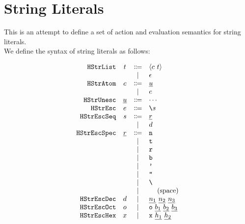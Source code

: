 \documentclass[12pt]{article}
\begin{document}
\section{String Literals}
This is an attempt to define a set of action and evaluation semantics for string literals. \\

\noindent We define the syntax of string literals as follows:
%
\begin{center}
  \vspace*{-1.5em}
  \[\begin{array}{rccl}
    \texttt{HStrList}    & t    & \Coloneqq & \langle c~t \rangle \\
                &                 & \mid         & \epsilon                            \\
    \texttt{HStrAtom}    & c    & \Coloneqq & \underline{u}                         \\
                &                 & \mid         & e                           \\
    \texttt{HStrUnesc}   & \underline{u}   & \Coloneqq & \cdots                                     \\
    \texttt{HStrEsc}     & e     & \Coloneqq & \texttt{\textbackslash}s              \\
    \texttt{HStrEscSeq}  & s  & \Coloneqq & \underline{r}                       \\
                &                 & \mid         & d                        \\
    \texttt{HStrEscSpec} & \underline{r} & \Coloneqq & \texttt{n}                                     \\
                &                 & \mid         & \texttt{t}                                     \\
                &                 & \mid         & \texttt{r}                                     \\
                &                 & \mid         & \texttt{b}                                     \\
                &                 & \mid         & \texttt{'}                                     \\
                &                 & \mid         & \texttt{"}                                     \\
                &                 & \mid         & \texttt{\textbackslash}                        \\
                &                 & \mid         & \texttt{ }~~\text{(space)}                            \\ 
    \texttt{HStrEscDec}  & d  & \mid         & \underline{n_{1}}~\underline{n_{2}}~\underline{n_{3}}                          \\
    \texttt{HStrEscOct}  & o  & \mid         & \texttt{o}~\underline{b_{1}}~\underline{b_{2}}~\underline{b_{3}}                          \\
    \texttt{HStrEscHex}  & x  & \mid         & \texttt{x}~\underline{h_{1}}~\underline{h_{2}}                          \\
  \end{array}\]
\end{center}
\end{document}
